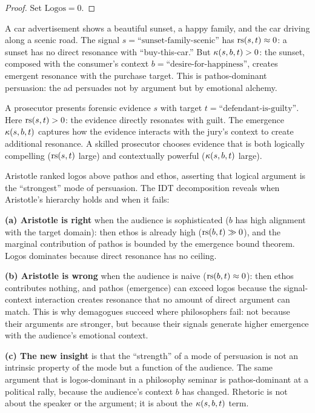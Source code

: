 \begin{proof}
Set $\text{Logos} = 0$.
\end{proof}

\begin{example}
A car advertisement shows a beautiful sunset, a happy family, and the car
driving along a scenic road. The signal $s = \text{``sunset-family-scenic''}$
has $\mathrm{rs}(s, t) \approx 0$: a sunset has no direct resonance with
``buy-this-car.'' But $\kappa(s, b, t) > 0$: the sunset, composed with the
consumer's context $b = \text{``desire-for-happiness''}$, creates emergent
resonance with the purchase target. This is pathos-dominant persuasion:
the ad persuades not by argument but by emotional alchemy.
\end{example}

\begin{example}
A prosecutor presents forensic evidence $s$ with target
$t = \text{``defendant-is-guilty''}$. Here $\mathrm{rs}(s, t) > 0$: the evidence
directly resonates with guilt. The emergence $\kappa(s, b, t)$ captures
how the evidence interacts with the jury's context to create additional
resonance. A skilled prosecutor chooses evidence that is both logically
compelling ($\mathrm{rs}(s,t)$ large) and contextually powerful ($\kappa(s,b,t)$
large).
\end{example}

\begin{interpretation}
Aristotle ranked logos above pathos and ethos, asserting that logical
argument is the ``strongest'' mode of persuasion. The IDT decomposition
reveals when Aristotle's hierarchy holds and when it fails:

\textbf{(a) Aristotle is right} when the audience is sophisticated
($b$ has high alignment with the target domain): then ethos is already
high ($\mathrm{rs}(b, t) \gg 0$), and the marginal contribution of pathos
is bounded by the emergence bound theorem. Logos dominates because
direct resonance has no ceiling.

\textbf{(b) Aristotle is wrong} when the audience is naive ($\mathrm{rs}(b, t)
\approx 0$): then ethos contributes nothing, and pathos (emergence)
can exceed logos because the signal-context interaction creates resonance
that no amount of direct argument can match. This is why demagogues
succeed where philosophers fail: not because their arguments are
stronger, but because their signals generate higher emergence with the
audience's emotional context.

\textbf{(c) The new insight} is that the ``strength'' of a mode of
persuasion is not an intrinsic property of the mode but a function of
the audience. The same argument that is logos-dominant in a philosophy
seminar is pathos-dominant at a political rally, because the audience's
context $b$ has changed. Rhetoric is not about the speaker or the
argument; it is about the $\kappa(s, b, t)$ term.
\end{interpretation}


